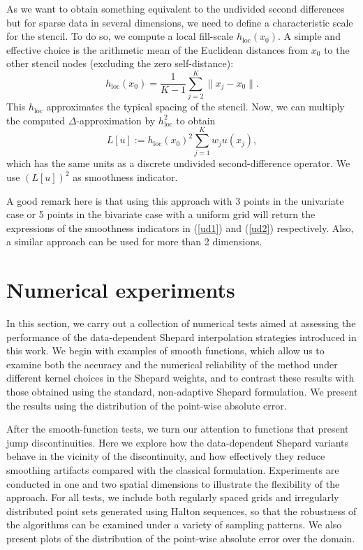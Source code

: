 \documentclass[preprint]{elsarticle}       %
\begin{document}
As we want to obtain something equivalent to the undivided second differences but for sparse data in several dimensions, we need to define a characteristic scale for the stencil. To do so, we compute a local fill-scale $h_{\text{loc}}(x_0)$. A simple and effective choice is the arithmetic mean of the Euclidean distances from $x_0$ to the other stencil nodes (excluding the zero self-distance):
\[
h_{\text{loc}}(x_0) = \frac{1}{K-1} \sum_{j=2}^K \|x_j - x_0\|.
\]
This $h_{\text{loc}}$ approximates the typical spacing of the stencil. Now, we can multiply the computed $\Delta$-approximation by $h_{\text{loc}}^2$ to obtain
\[
L[u] := h_{\text{loc}}(x_0)^2 \sum_{j=1}^K w_j u(x_j),
\]
which has the same units as a discrete undivided second-difference operator. We use $(L[u])^2$ as smoothness indicator.

A good remark here is that using this approach with 3 points in the univariate case or 5 points in the bivariate case with a uniform grid will return the expressions of the smoothness indicators in (\ref{ud1}) and (\ref{ud2}) respectively. Also, a similar approach can be used for more than 2 dimensions.


\section{Numerical experiments}
In this section, we carry out a collection of numerical tests aimed at assessing the performance of the data-dependent Shepard interpolation strategies introduced in this work. We begin with examples of smooth functions, which allow us to examine both the accuracy and the numerical reliability of the method under different kernel choices in the Shepard weights, and to contrast these results with those obtained using the standard, non-adaptive Shepard formulation. We present the results using the distribution of the point-wise absolute error.

After the smooth-function tests, we turn our attention to functions that present jump discontinuities. Here we explore how the data-dependent Shepard variants behave in the vicinity of the discontinuity, and how effectively they reduce smoothing artifacts compared with the classical formulation. Experiments are conducted in one and two spatial dimensions to illustrate the flexibility of the approach. For all tests, we include both regularly spaced grids and irregularly distributed point sets generated using Halton sequences, so that the robustness of the algorithms can be examined under a variety of sampling patterns. We also present plots of the distribution of the point-wise absolute error over the domain.
\end{document}
